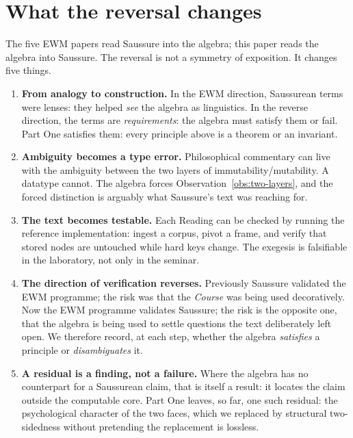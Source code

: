 \documentclass[11pt,a4paper]{article}
\theoremstyle{remark}
\begin{document}
\FloatBarrier
\section{What the reversal changes}
\label{sec:reversal}

The five EWM papers read Saussure into the algebra; this paper reads the
algebra into Saussure. The reversal is not a symmetry of exposition. It changes
five things.

\begin{enumerate}[leftmargin=*,nosep]
  \item \textbf{From analogy to construction.} In the EWM direction, Saussurean
    terms were lenses: they helped \emph{see} the algebra as linguistics. In
    the reverse direction, the terms are \emph{requirements}: the algebra must
    satisfy them or fail. Part One satisfies them: every principle above is a
    theorem or an invariant.
  \item \textbf{Ambiguity becomes a type error.} Philosophical commentary can
    live with the ambiguity between the two layers of immutability/mutability.
    A datatype cannot. The algebra forces Observation~\ref{obs:two-layers}, and
    the forced distinction is arguably what Saussure's text was reaching for.
  \item \textbf{The text becomes testable.} Each Reading can be checked by
    running the reference implementation: ingest a corpus, pivot a frame, and
    verify that stored nodes are untouched while hard keys change. The exegesis
    is falsifiable in the laboratory, not only in the seminar.
  \item \textbf{The direction of verification reverses.} Previously Saussure
    validated the EWM programme; the risk was that the \textit{Course} was being
    used decoratively. Now the EWM programme validates Saussure; the risk is
    the opposite one, that the algebra is being used to settle questions the
    text deliberately left open. We therefore record, at each step, whether the
    algebra \emph{satisfies} a principle or \emph{disambiguates} it.
  \item \textbf{A residual is a finding, not a failure.} Where the algebra has
    no counterpart for a Saussurean claim, that is itself a result: it locates
    the claim outside the computable core. Part One leaves, so far, one such
    residual: the psychological character of the two faces, which we replaced by
    structural two-sidedness without pretending the replacement is lossless.
\end{enumerate}
\end{document}
